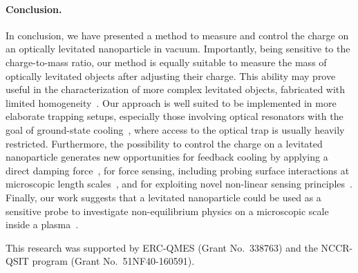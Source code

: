 \documentclass[aps,amssymb,amsmath,pra,reprint,noshowpacs]{revtex4-1}
\begin{document}
\paragraph{Conclusion.} In conclusion, we have presented a method to measure and control the charge on an optically levitated nanoparticle in vacuum. Importantly, being sensitive to the charge-to-mass ratio, our method is equally suitable to measure the mass of optically levitated objects after adjusting their charge. This ability may prove useful in the characterization of more complex levitated objects, fabricated with limited homogeneity~\cite{Neukirch2015,Rahman2017}. Our approach is well suited to be implemented in more elaborate trapping setups, especially those involving optical resonators with the goal of ground-state cooling~\cite{Kiesel2013,Fonseca2016}, where access to the optical trap is usually heavily restricted. Furthermore, the possibility to control the charge on a levitated nanoparticle generates new opportunities for feedback cooling by applying a direct damping force~\cite{Poggio2007}, for force sensing, including probing surface interactions at microscopic length scales~\cite{Stern1988,Terris1989,Bressi2002,Schonenberger1990}, and for exploiting novel non-linear sensing principles~\cite{Leuch2016}. {Finally, our work suggests that a levitated nanoparticle could be used as a sensitive probe to investigate
non-equilibrium physics on a microscopic scale inside a plasma~\cite{Gieseler2014,Schablinski2015}.}




\begin{acknowledgments}
This research was supported by ERC-QMES (Grant No.~338763) and the NCCR-QSIT program (Grant No.~51NF40-160591).
\end{acknowledgments}


\end{document}
